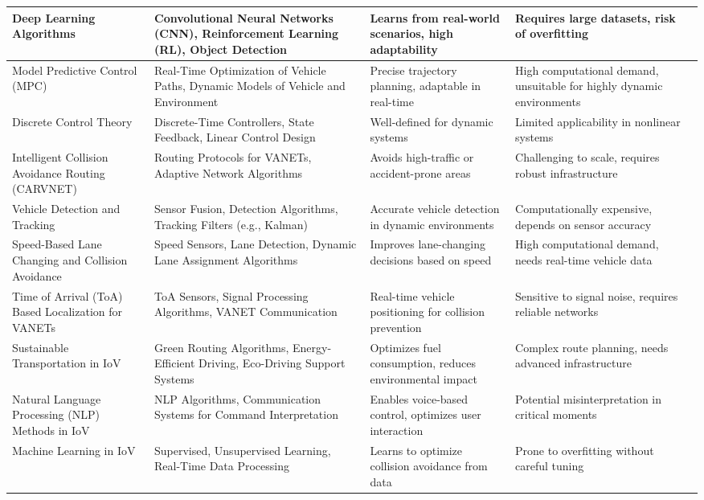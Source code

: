\documentclass[12pt,twocolumn]{article}
\begin{document}
\begin{longtable}{|p{3cm}|p{4cm}|p{3cm}|p{3cm}|p{3cm}|}
Deep Learning Algorithms & Convolutional Neural Networks (CNN), Reinforcement Learning (RL), Object Detection & Learns from real-world scenarios, high adaptability & Requires large datasets, risk of overfitting & \citet{li2020} \\ \hline
Model Predictive Control (MPC) & Real-Time Optimization of Vehicle Paths, Dynamic Models of Vehicle and Environment & Precise trajectory planning, adaptable in real-time & High computational demand, unsuitable for highly dynamic environments & \citet{abbas2017} \\ \hline
Discrete Control Theory & Discrete-Time Controllers, State Feedback, Linear Control Design & Well-defined for dynamic systems & Limited applicability in nonlinear systems & \citet{berard2008} \\ \hline
Intelligent Collision Avoidance Routing (CARVNET) & Routing Protocols for VANETs, Adaptive Network Algorithms & Avoids high-traffic or accident-prone areas & Challenging to scale, requires robust infrastructure & \citet{kaur2022} \\ \hline
Vehicle Detection and Tracking & Sensor Fusion, Detection Algorithms, Tracking Filters (e.g., Kalman) & Accurate vehicle detection in dynamic environments & Computationally expensive, depends on sensor accuracy & \citet{mukhtar2015}\\ \hline
Speed-Based Lane Changing and Collision Avoidance & Speed Sensors, Lane Detection, Dynamic Lane Assignment Algorithms & Improves lane-changing decisions based on speed & High computational demand, needs real-time vehicle data & \citet{song2018} \\ \hline
Time of Arrival (ToA) Based Localization for VANETs & ToA Sensors, Signal Processing Algorithms, VANET Communication & Real-time vehicle positioning for collision prevention & Sensitive to signal noise, requires reliable networks & \citet{naikcloud2019} \\ \hline
Sustainable Transportation in IoV & Green Routing Algorithms, Energy-Efficient Driving, Eco-Driving Support Systems & Optimizes fuel consumption, reduces environmental impact & Complex route planning, needs advanced infrastructure & \citet{balasubramaniam2017} \\ \hline
Natural Language Processing (NLP) Methods in IoV & NLP Algorithms, Communication Systems for Command Interpretation & Enables voice-based control, optimizes user interaction & Potential misinterpretation in critical moments & \citet{putri2021} \\ \hline
Machine Learning in IoV & Supervised, Unsupervised Learning, Real-Time Data Processing & Learns to optimize collision avoidance from data & Prone to overfitting without careful tuning &\citet{yuan2022} \\ \hline

\end{longtable}
\twocolumn
\end{document}
